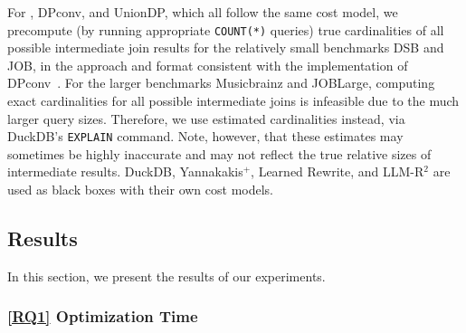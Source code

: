 For \sys{}, DPconv, and UnionDP, which all follow the same cost model, we precompute (by running appropriate \texttt{COUNT(*)} queries) true cardinalities of all possible intermediate join results for the relatively small benchmarks DSB and JOB, in the approach and format consistent with the implementation of DPconv~\cite{stoian_dpconv_2024}. 
For the larger benchmarks Musicbrainz and JOBLarge, computing exact cardinalities for all possible intermediate joins is infeasible due to the much larger query sizes. Therefore, we use estimated cardinalities instead, via DuckDB's \texttt{EXPLAIN} command. Note, however, that these estimates may sometimes be highly inaccurate and may not reflect the true relative sizes of intermediate results.
DuckDB, Yannakakis$^+$, Learned Rewrite, and LLM-R$^2$ are used as black boxes with their own cost models.

\subsection{Results}



In this section, we present the results of our experiments.

\subsubsection{\ref{RQ1} Optimization Time}


